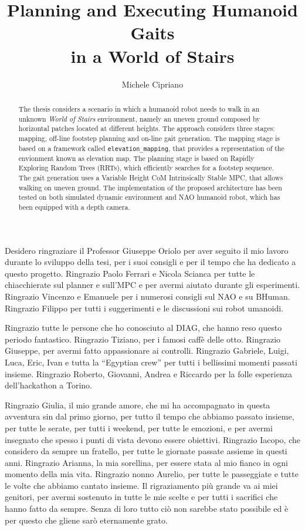 \documentclass[LaM,binding=0.6cm]{sapthesis}
\title{Planning and Executing Humanoid Gaits \\in a World of Stairs}
\author{Michele Cipriano}
\begin{document}
\frontmatter

\maketitle

\dedication{A mamma e pap\`a.}

\begin{abstract}
The thesis considers a scenario in which a humanoid robot needs to walk
in an unknown \textit{World of Stairs} environment, namely an uneven ground
composed by horizontal patches located at different heights. The approach
considers three stages: mapping, off-line footstep planning and on-line
gait generation. The mapping stage is based on a framework called
\texttt{elevation\_mapping}, that provides a representation of the 
envionment known as elevation map. The planning stage is based on Rapidly
Exploring Random Trees (RRTs), which efficiently searches for a footstep
sequence. The gait generation uses a Variable Height CoM Intrinsically Stable
MPC, that allows walking on uneven ground. The implementation of the
proposed architecture has been tested on both simulated dynamic environment
and NAO humanoid robot, which has been equipped with a depth camera.
\end{abstract}

\begin{acknowledgments}
Desidero ringraziare il Professor Giuseppe Oriolo per aver seguito il mio 
lavoro durante lo sviluppo della tesi, per i suoi consigli e per il tempo 
che ha dedicato a questo progetto. Ringrazio Paolo Ferrari e Nicola Scianca per 
tutte le chiacchierate sul planner e sull'MPC e per avermi aiutato durante
gli esperimenti. Ringrazio Vincenzo e Emanuele per i numerosi consigli sul NAO
e su BHuman. Ringrazio Filippo per tutti i suggerimenti e le discussioni 
sui robot umanoidi.

Ringrazio tutte le persone che ho conosciuto al DIAG, che hanno reso questo
periodo fantastico. Ringrazio Tiziano, per i famosi caff\`e delle otto. Ringrazio
Giuseppe, per avermi fatto appassionare ai controlli. Ringrazio Gabriele,
Luigi, Luca, Eric, Ivan e tutta la ``Egyptian crew'' per tutti i bellissimi
momenti passati insieme.
Ringrazio Roberto, Giovanni, Andrea
e Riccardo per la folle esperienza dell'hackathon a Torino.

Ringrazio Giulia, il mio grande amore, che mi ha accompagnato in questa
avventura sin dal
primo giorno, per tutto il tempo che abbiamo passato insieme, per tutte le 
serate, per tutti i weekend,
per tutte le emozioni, e
per avermi insegnato che spesso i punti di vista devono essere obiettivi.
Ringrazio Iacopo, che considero da sempre un fratello, per tutte 
le giornate passate assieme in questi anni. Ringrazio Arianna, la mia sorellina,
per essere stata al mio fianco in ogni momento della mia vita. Ringrazio nonno
Aurelio, per tutte le passeggiate e tutte le volte che abbiamo cantato insieme.
Il rigraziamento pi\`u grande va ai miei genitori, per avermi sostenuto in tutte
le mie scelte e per tutti i sacrifici che hanno fatto da sempre. Senza di loro
tutto ci\`o non sarebbe stato possibile ed \`e per questo che gliene sar\`o
eternamente grato.
\end{acknowledgments}
\end{document}
